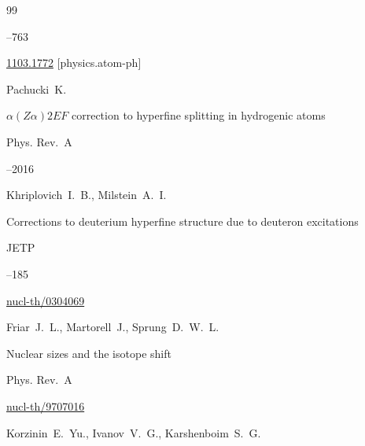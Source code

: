 \begin{thebibliography}{99}



--763


\arxiv \href{http://arxiv.org/abs/1103.1772}{1103.1772} [physics.atom-ph]




\by Pachucki~K.

\paper  $\alpha(Z\alpha)2EF$ correction to hyperfine splitting in hydrogenic atoms

\jour Phys. Rev.~A




--2016





\by Khriplovich~I.~B., Milstein~A.~I.

\paper Corrections to deuterium hyperfine structure due to deuteron excitations

\jour JETP




--185


\arxiv \href{http://arxiv.org/abs/nucl-th/0304069}{nucl-th/0304069}




\by Friar~J.~L., Martorell~J., Sprung~D.~W.~L.

\paper Nuclear sizes and the isotope shift

\jour Phys. Rev.~A






\arxiv \href{http://arxiv.org/abs/nucl-th/9707016}{nucl-th/9707016}




\by Korzinin~E.~Yu., Ivanov~V.~G., Karshenboim~S.~G.


\end{thebibliography}
